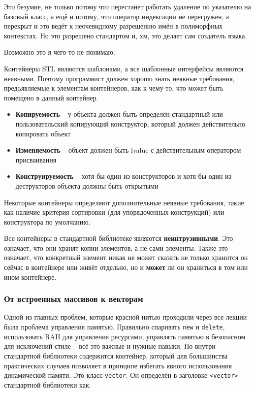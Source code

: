 \documentclass[a4paper,12pt,oneside]{article}
\begin{document}
Это безумие, не только потому что перестанет работать удаление по указателю на базовый класс, а ещё и потому, что оператор индексации не перегружен, а перекрыт и это ведёт к неочевидному разрешению имён в полиморфных контекстах. Но это разрешено стандартом и, хм, это делает сам создатель языка.

Возможно это я чего-то не понимаю.

Контейнеры STL являются шаблонами, а все шаблонные интерфейсы являются неявными. Поэтому программист должен хорошо знать неявные требования, предъявляемые к элементам контейнеров, как к чему-то, что может быть помещено в данный контейнер.

\begin{itemize}
\item \textbf{Копируемость} -- у объекта должен быть определён стандартный или пользовательский копирующий конструктор, который должен действительно копировать объект
\item \textbf{Изменяемость} -- объект должен быть lvalue с действительным оператором присваивания
\item \textbf{Конструируемость} -- хотя бы один из конструкторов и хотя бы один из деструкторов объекта должны быть открытыми
\end{itemize}

Некоторые контейнеры определяют дополнительные неявные требования, такие как наличие критерия сортировки (для упорядоченных конструкций) или конструктора по умолчанию.

Все контейнеры в стандартной библиотеке являются \textbf{неинтрузивными}. Это означает, что они хранят копии элементов, а не сами элементы. Также это означает, что конкретный элемент никак не может сказать не только хранится он сейчас в контейнере или живёт отдельно, но и \textbf{может} ли он храниться в том или ином контейнере.

\subsubsection{От встроенных массивов к векторам}\label{vectorarrs}

Одной из главных проблем, которые красной нитью проходили через все лекции была проблема управления памятью. Правильно спаривать \lstinline!new! и \lstinline!delete!, использовать RAII для управления ресурсами, управлять памятью в безопасном для исключений стиле -- всё это важные и нужные навыки. Но внутри стандартной библиотеки содержится контейнер, который для большинства практических случаев позволяет в принципе избегать явного использования динамической памяти. Это класс \lstinline!vector!. Он определён в заголовке \lstinline!<vector>! стандартной библиотеки как:
\end{document}
